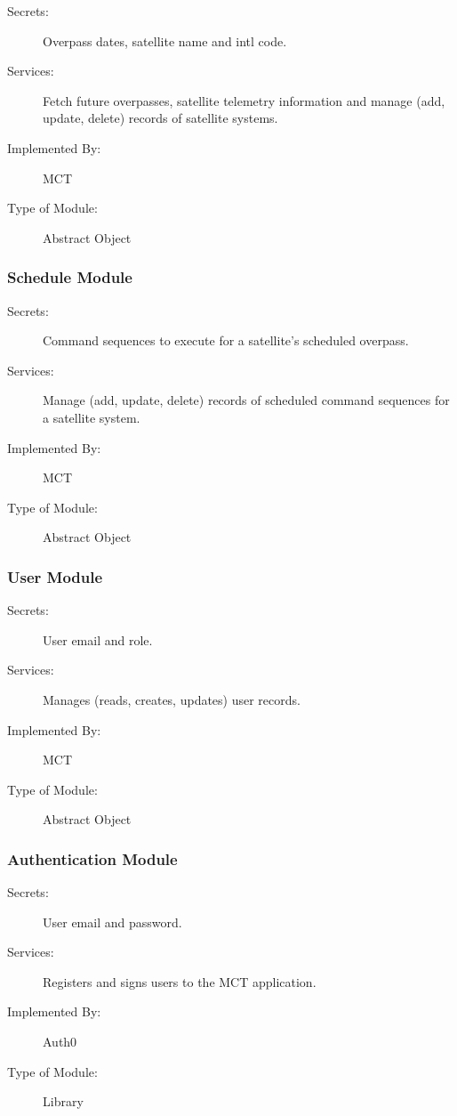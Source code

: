 \documentclass[12pt, titlepage]{article}
\begin{document}
\begin{description}
\item[Secrets:]Overpass dates, satellite name and intl code.
\item[Services:]Fetch future overpasses, satellite telemetry information and manage (add, update, delete) records of satellite systems.
\item[Implemented By:] MCT
\item[Type of Module:] Abstract Object
\end{description}

\subsubsection{Schedule Module }

\begin{description}
\item[Secrets:] Command sequences to execute for a satellite's scheduled overpass.
\item[Services:]Manage (add, update, delete) records of scheduled command sequences for a satellite system.
\item[Implemented By:] MCT
\item[Type of Module:] Abstract Object
\end{description}

\subsubsection{User Module }

\begin{description}
\item[Secrets:] User email and role.
\item[Services:] Manages (reads, creates, updates) user records.
\item[Implemented By:] MCT
\item[Type of Module:] Abstract Object
\end{description}

\subsubsection{Authentication Module }

\begin{description}
\item[Secrets:] User email and password.
\item[Services:] Registers and signs users to the MCT application.
\item[Implemented By:] Auth0
\item[Type of Module:] Library
\end{description}
\end{document}
